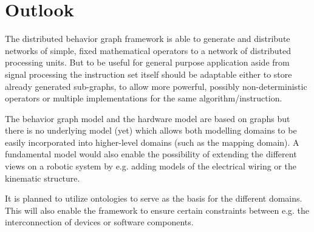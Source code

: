 \documentclass[a4paper,twocolumn]{esapub2005} %
\begin{document}
\section{Outlook}
The distributed behavior graph framework is able to generate and distribute networks of simple, fixed mathematical operators to a network of distributed processing units.
But to be useful for general purpose application aside from signal processing the instruction set itself should be adaptable either to store already generated sub-graphs, to allow more powerful, possibly non-deterministic operators or multiple implementations for the same algorithm/instruction.

The behavior graph model and the hardware model are based on graphs but there is no underlying model (yet) which allows both modelling domains to be easily incorporated into higher-level domains (such as the mapping domain).
A fundamental model would also enable the possibility of extending the different views on a robotic system by e.g. adding models of the electrical wiring or the kinematic structure.

It is planned to utilize ontologies to serve as the basis for the different domains.
This will also enable the framework to ensure certain constraints between e.g. the interconnection of devices or software components.

\pagebreak



\end{document}
